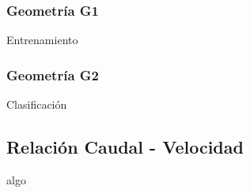 \documentclass[spanish]{beamer}
\begin{document}
\subsubsection{Geometría G1}
\begin{frame}{Entrenamiento}
\end{frame}
%
\subsubsection{Geometría G2}
\begin{frame}{Clasificación}
\end{frame}
%
\subsection{Relación Caudal - Velocidad}
\begin{frame}{algo}
\end{frame}
\end{document}
